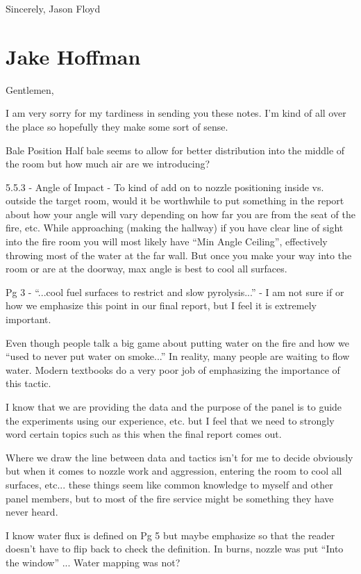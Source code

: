 \documentclass[12pt,oneside]{book}
\begin{document}
\begin{appendix}
Sincerely,
Jason Floyd

\section{Jake Hoffman}

Gentlemen,

I am very sorry for my tardiness in sending you these notes.  I'm kind of all over the place so hopefully they make some sort of sense. 

Bale Position
Half bale seems to allow for better distribution into the middle of the room but how much air are we introducing?

5.5.3 - Angle of Impact - To kind of add on to nozzle positioning inside vs. outside the target room, would it be worthwhile to put something in the report about how your angle will vary depending on how far you are from the seat of the fire, etc.  While approaching (making the hallway) if you have clear line of sight into the fire room you will most likely have ``Min Angle Ceiling'', effectively throwing most of the water at the far wall.  But once you make your way into the room or are at the doorway, max angle is best to cool all surfaces.

Pg 3 -  ``...cool fuel surfaces to restrict and slow pyrolysis...'' - I am not sure if or how we emphasize this point in our final report, but I feel it is extremely important.  

Even though people talk a big game about putting water on the fire and how we ``used to never put water on smoke...'' In reality, many people are waiting to flow water.  Modern textbooks do a very poor job of emphasizing the importance of this tactic. 

I know that we are providing the data and the purpose of the panel is to guide the experiments using our experience, etc. but I feel that we need to strongly word certain topics such as this when the final report comes out. 

Where we draw the line between data and tactics isn't for me to decide obviously but when it comes to nozzle work and aggression, entering the room to cool all surfaces, etc... these things seem like common knowledge to myself and other panel members, but to most of the fire service might be something they have never heard.

I know water flux is defined on Pg 5 but maybe emphasize so that the reader doesn't have to flip back to check the definition. In burns, nozzle was put ``Into the window'' ... Water mapping was not?


\end{appendix}
\end{document}
